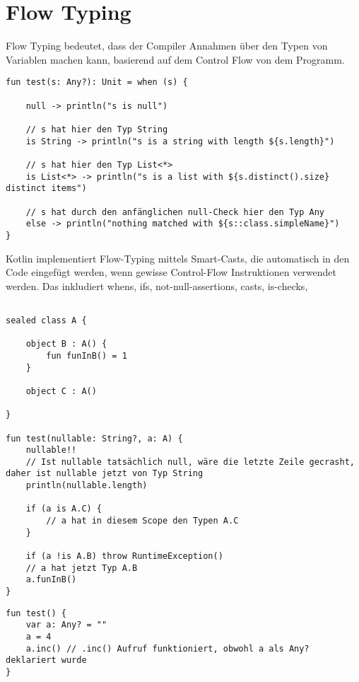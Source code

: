 
\section{Flow Typing}\label{sec:flow-typing}

\renewcommand{\kapitelautor}{Autor: Marvin Kurka}

Flow Typing bedeutet, dass der Compiler Annahmen über den Typen von Variablen machen kann, basierend auf dem Control
Flow von dem Programm.

\begin{verbatim}
fun test(s: Any?): Unit = when (s) {

    null -> println("s is null")

    // s hat hier den Typ String
    is String -> println("s is a string with length ${s.length}")

    // s hat hier den Typ List<*>
    is List<*> -> println("s is a list with ${s.distinct().size} distinct items")

    // s hat durch den anfänglichen null-Check hier den Typ Any
    else -> println("nothing matched with ${s::class.simpleName}")
}
\end{verbatim}

Kotlin implementiert Flow-Typing mittels Smart-Casts, die automatisch in den Code eingefügt werden, wenn gewisse
Control-Flow Instruktionen verwendet werden.
Das inkludiert \zB whens, ifs, not-null-assertions, casts, is-checks, \usw

\begin{verbatim}

sealed class A {

    object B : A() {
        fun funInB() = 1
    }

    object C : A()

}

fun test(nullable: String?, a: A) {
    nullable!!
    // Ist nullable tatsächlich null, wäre die letzte Zeile gecrasht, daher ist nullable jetzt von Typ String
    println(nullable.length)

    if (a is A.C) {
        // a hat in diesem Scope den Typen A.C
    }

    if (a !is A.B) throw RuntimeException()
    // a hat jetzt Typ A.B
    a.funInB()
}
\end{verbatim}

\begin{verbatim}
fun test() {
    var a: Any? = ""
    a = 4
    a.inc() // .inc() Aufruf funktioniert, obwohl a als Any? deklariert wurde
}
\end{verbatim}

